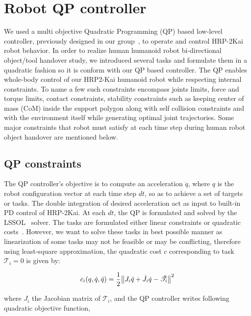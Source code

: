 \documentclass[a4paper, 12pt, oneside]{Thesis}  %
\begin{document}
\clearpage

\section{Robot QP controller}\label{qpTasks}

We used a multi objective Quadratic Programming (QP) based low-level controller, previously designed in our group~\cite{ladder-HRP-2Kai}, to operate and control HRP-2Kai robot behavior. In order to realize human humanoid robot bi-directional object/tool handover study, we introduced several tasks and formulate them in a quadratic fashion so it is conform with our QP based controller. The QP enables whole-body control of our HRP2-Kai humanoid robot while respecting internal constraints. To name a few such constraints encompass joints limits, force and torque limits, contact constraints, stability constraints such as keeping center of mass (CoM) inside the support polygon along with self collision constraints and with the environment itself while generating optimal joint trajectories. Some major constraints that robot must satisfy at each time step during human robot object handover are mentioned below.


\subsection{QP constraints}
The QP controller's objective is to compute an acceleration $\ddot{q}$, where $q$ is the robot configuration vector at each time step $dt$, so as to achieve a set of targets or tasks. The double integration of desired acceleration act as input to built-in PD control of HRP-2Kai. At each $dt$, the QP is formulated and solved by the LSSOL~\cite{gill1986fortran} solver. The tasks are formulated either linear constraints or quadratic costs~\cite{ladder-HRP-2Kai, pfeiffer2017nut}. However, we want to solve these tasks in best possible manner as linearization of some tasks may not be feasible or may be conflicting, therefore using least-square approximation, the quadratic cost $c$ corresponding to task $\mathscr{T}_i =0$ is given by:

\begin{equation}
c_i(q,\dot{q}, \ddot{q})  = \frac{1}{2}{\norm{ J_i\ddot{q} + \dot{J}_i\dot{q} -\ddot{\mathscr{T}}_i }^2 }
\end{equation}

where $J_i$ the Jacobian matrix of $\mathscr{T}_i$, and the QP controller writes following quadratic objective function,
\end{document}
